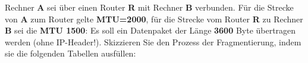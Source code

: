 
Rechner \textbf{A} sei über einen Router \textbf{R} mit Rechner \textbf{B} verbunden. Für die Strecke von \textbf{A} zum Router gelte \textbf{MTU=2000}, für die Strecke vom Router \textbf{R} zu Rechner \textbf{B} sei die \textbf{MTU 1500}:
Es soll ein Datenpaket der Länge \textbf{3600} Byte übertragen werden (ohne IP-Header!). Skizzieren Sie den Prozess der Fragmentierung, indem sie die folgenden Tabellen ausfüllen:

\begin{flushleft}
\end{flushleft}
